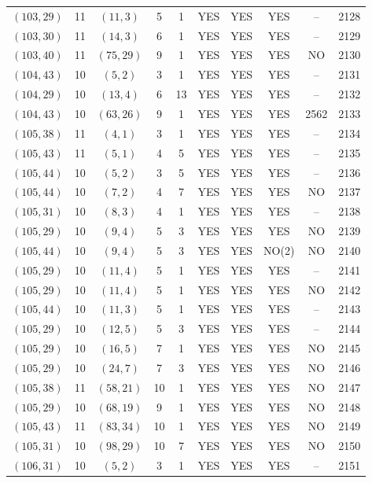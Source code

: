 \begin{longtable}{|c|c|c|c|c|c|c|c|c|c|}
$(103, 29)$ & 11 & $(11, 3)$ & 5 & 1 & YES & YES & YES & -- & 2128\\
$(103, 30)$ & 11 & $(14, 3)$ & 6 & 1 & YES & YES & YES & -- & 2129\\
$(103, 40)$ & 11 & $(75, 29)$ & 9 & 1 & YES & YES & YES & NO & 2130\\
$(104, 43)$ & 10 & $(5, 2)$ & 3 & 1 & YES & YES & YES & -- & 2131\\
$(104, 29)$ & 10 & $(13, 4)$ & 6 & 13 & YES & YES & YES & -- & 2132\\
$(104, 43)$ & 10 & $(63, 26)$ & 9 & 1 & YES & YES & YES & 2562 & 2133\\
$(105, 38)$ & 11 & $(4, 1)$ & 3 & 1 & YES & YES & YES & -- & 2134\\
$(105, 43)$ & 11 & $(5, 1)$ & 4 & 5 & YES & YES & YES & -- & 2135\\
$(105, 44)$ & 10 & $(5, 2)$ & 3 & 5 & YES & YES & YES & -- & 2136\\
$(105, 44)$ & 10 & $(7, 2)$ & 4 & 7 & YES & YES & YES & NO & 2137\\
$(105, 31)$ & 10 & $(8, 3)$ & 4 & 1 & YES & YES & YES & -- & 2138\\
$(105, 29)$ & 10 & $(9, 4)$ & 5 & 3 & YES & YES & YES & NO & 2139\\
$(105, 44)$ & 10 & $(9, 4)$ & 5 & 3 & YES & YES & NO(2) & NO & 2140\\
$(105, 29)$ & 10 & $(11, 4)$ & 5 & 1 & YES & YES & YES & -- & 2141\\
$(105, 29)$ & 10 & $(11, 4)$ & 5 & 1 & YES & YES & YES & NO & 2142\\
$(105, 44)$ & 10 & $(11, 3)$ & 5 & 1 & YES & YES & YES & -- & 2143\\
$(105, 29)$ & 10 & $(12, 5)$ & 5 & 3 & YES & YES & YES & -- & 2144\\
$(105, 29)$ & 10 & $(16, 5)$ & 7 & 1 & YES & YES & YES & NO & 2145\\
$(105, 29)$ & 10 & $(24, 7)$ & 7 & 3 & YES & YES & YES & NO & 2146\\
$(105, 38)$ & 11 & $(58, 21)$ & 10 & 1 & YES & YES & YES & NO & 2147\\
$(105, 29)$ & 10 & $(68, 19)$ & 9 & 1 & YES & YES & YES & NO & 2148\\
$(105, 43)$ & 11 & $(83, 34)$ & 10 & 1 & YES & YES & YES & NO & 2149\\
$(105, 31)$ & 10 & $(98, 29)$ & 10 & 7 & YES & YES & YES & NO & 2150\\
$(106, 31)$ & 10 & $(5, 2)$ & 3 & 1 & YES & YES & YES & -- & 2151\\

\end{longtable}
